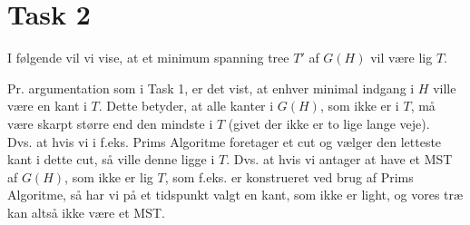 \section{Task 2}

I følgende vil vi vise, at et minimum spanning tree $T'$ af $G(H)$ vil være lig $T$.

Pr. argumentation som i Task 1, er det vist, at enhver minimal indgang i $H$ ville være en kant i $T$. Dette betyder, at alle kanter i $G(H)$, som ikke er i $T$, må være skarpt større end den mindste i $T$ (givet der ikke er to lige lange veje).\\
Dvs. at hvis vi i f.eks. Prims Algoritme foretager et cut og vælger den letteste kant i dette cut, så ville denne ligge i $T$.
Dvs. at hvis vi antager at have et MST af $G(H)$, som ikke er lig $T$, som f.eks. er konstrueret ved brug af Prims Algoritme, så har vi på et tidspunkt valgt en kant, som ikke er light, og vores træ kan altså ikke være et MST. 
